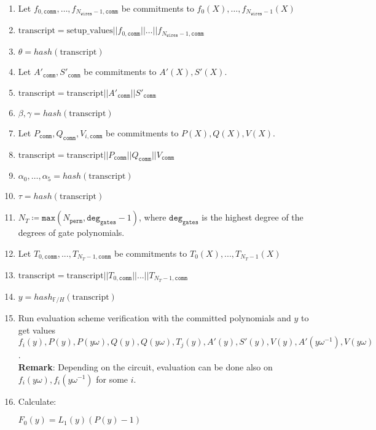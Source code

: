 \begin{enumerate}
    \item Let $f_{0, \texttt{comm}}, \dots, f_{N_{\texttt{wires}} - 1, \texttt{comm}}$ be commitments to $f_{0}(X), \dots, f_{N_{\texttt{wires}} - 1}(X)$
    \item $\text{transcript} = \text{setup\_values} || f_{0, \texttt{comm}} || \dots || f_{N_{\texttt{wires}} - 1, \texttt{comm}}$
    \item $\theta = hash(\text{transcript})$
    \item Let $A'_{\texttt{comm}}, S'_{\texttt{comm}}$ be commitments to $A'(X), S'(X)$.
    \item $\text{transcript} = \text{transcript} || A'_{\texttt{comm}} || S'_{\texttt{comm}}$ 
    \item $\beta, \gamma = hash(\text{transcript})$
    \item Let $P_{\texttt{comm}}, Q_{\texttt{comm}}, V_{i, \texttt{comm}}$ be commitments to $P(X), Q(X), V(X)$.
    \item $\text{transcript} = \text{transcript} || P_{\texttt{comm}} || Q_{\texttt{comm}} || V_{\texttt{comm}}$
    \item $\alpha_0, \dots, \alpha_5 = hash(\text{transcript})$
    \item $\tau = hash(\text{transcript})$
    \item $N_T \coloneqq \texttt{max}(N_{\texttt{perm}}, \texttt{deg}_{\texttt{gates}} - 1)$, 
		where $\texttt{deg}_{\texttt{gates}}$ is the highest degree of the degrees of gate polynomials. 
    \item Let $T_{0, \texttt{comm}}, ..., T_{N_T - 1, \texttt{comm}}$ be commitments to $T_0(X), ..., T_{N_T - 1}(X)$ 
    \item $\text{transcript} = \text{transcript} || T_{0, \texttt{comm}} || ... || T_{N_T - 1, \texttt{comm}}$
    \item $y = hash_{\mathbb{F}/H}(\text{transcript})$
    \item Run evaluation scheme verification with the committed polynomials and $y$ to get values 
        $f_i(y), P(y), P(y\omega), Q(y), Q(y\omega), T_j(y), A'(y), S'(y), V(y), A'(y\omega^{-1}), V(y\omega)$.  \\
        \textbf{Remark}: Depending on the circuit, evaluation can be done also on $f_i(y\omega), f_i(y\omega^{-1})$ for some $i$.
    \item Calculate:
        \begin{center}
            $F_0(y) = L_1(y)(P(y) - 1)$ \\

\end{center}
\end{enumerate}
